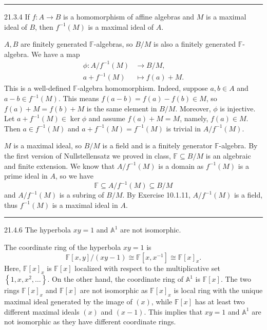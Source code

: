 \documentclass[letterpaper, 12pt]{article}
\begin{document}
\noindent\rule{7in}{2.8pt}
\begin{problem}{21.3.4}
If \(f:A\rightarrow B\) is a homomorphism of affine algebras and \(M\) is a maximal ideal of \(B\), then \(f^{-1}(M)\) is a maximal ideal of \(A\).
\end{problem}
\begin{solution}
\(A,B\) are finitely generated \(\mathbb{F}\)-algebras, so \(B/M\) is also a finitely generated \(\mathbb{F}\)-algebra. We have a map 
\begin{align*}
    \phi: A/f^{-1}(M)&\rightarrow B/M,\\ 
          a+f^{-1}(M)&\mapsto f(a)+M.
\end{align*}
This is a well-defined \(\mathbb{F}\)-algebra homomorphism. Indeed, suppose \(a,b\in A\) and \(a-b\in f^{-1}(M)\). This means \(f(a-b)=f(a)-f(b)\in M\), so \(f(a)+M=f(b)+M\) is the same element in \(B/M\). Moreover, \(\phi\) is injective. Let \(a+f^{-1}(M)\in \ker \phi\) and assume \(f(a)+M=M\), namely, \(f(a)\in M\). Then \(a\in f^{-1}(M)\) and \(a+f^{-1}(M)=f^{-1}(M)\) is trivial in \(A/f^{-1}(M)\). 

\(M\) is a maximal ideal, so \(B/M\) is a field and is a finitely generator \(\mathbb{F}\)-algebra. By the first version of Nullstellensatz we proved in class, \(\mathbb{F}\subseteq B/M\) is an algebraic and finite extension. We know that \(A/f^{-1}(M)\) is a domain as \(f^{-1}(M)\) is a prime ideal in \(A\), so we have 
\[\mathbb{F}\subseteq A/f^{-1}(M)\subseteq B/M\]
and \(A/f^{-1}(M)\) is a subring of \(B/M\). By Exercise 10.1.11, \(A/f^{-1}(M)\) is a field, thus \(f^{-1}(M)\) is a maximal ideal in \(A\). 
\end{solution}

\noindent\rule{7in}{2.8pt}
\begin{problem}{21.4.6}
The hyperbola \(xy=1\) and \(\mathbb{A}^1\) are not isomorphic.
\end{problem}
\begin{solution}
The coordinate ring of the hyperbola \(xy=1\) is 
\[\mathbb{F}[x,y]/(xy-1)\cong \mathbb{F}[x,x^{-1}]\cong \mathbb{F}[x]_x.\]
Here, \(\mathbb{F}[x]_x\) is \(\mathbb{F}[x]\) localized with respect to the multiplicative set \(\left\{ 1,x,x^2,\ldots \right\}\). On the other hand, the coordinate ring of \(\mathbb{A}^1\) is \(\mathbb{F}[x]\). The two rings \(\mathbb{F}[x]_x\) and \(\mathbb{F}[x]\) are not isomorphic as \(\mathbb{F}[x]_x\) is local ring with the unique maximal ideal generated by the image of \((x)\), while \(\mathbb{F}[x]\) has at least two different maximal ideals \((x)\) and \((x-1)\). This implies that \(xy=1\) and \(\mathbb{A}^1\) are not isomorphic as they have different coordinate rings.
\end{solution}
\end{document}
